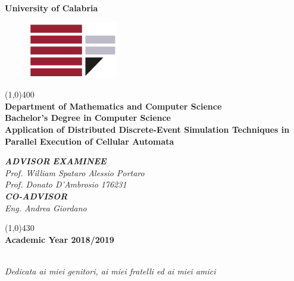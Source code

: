 \documentclass[12pt,a4paper,fleqn]{report}
\begin{document}
\begin{titlepage}
\begin{center}
\huge{\textbf{University of Calabria}}\\
\begin{figure}[bt]
\centering
\includegraphics[scale=0.5]{Stemma}\\
\end{figure}
\line(1,0){400}\\[5mm]
\Large{\textbf{Department of Mathematics and Computer Science}}\\
\Large{\textbf{Bachelor's Degree in Computer Science}}\\
\vspace{35mm}
\Huge{\textbf{Application of Distributed Discrete-Event Simulation Techniques in Parallel Execution of Cellular Automata}}
\end{center}
\vspace{35mm}
\begin{flushleft}
\large{\textsc{\textit{\textbf{ADVISOR}}}}
\hfill \large{\textit{\textsc{\textbf{EXAMINEE}}}}\\
\Large{\textit{Prof. William Spataro}}
\hfill \Large{\textit{Alessio Portaro}}\\
\Large{\textit{Prof. Donato D'Ambrosio}}
\hfill \Large{\textit{176231}}\\
\large{\textsc{\textit{\textbf{CO-ADVISOR}}}}\\
\Large{\textit{Eng. Andrea Giordano}}
\end{flushleft}
\vfill
\begin{center}
\line(1,0){430}\\[5mm]
{\large{\bf Academic Year 2018/2019}}\\
\end{center}
\end{titlepage}
\newpage 
\null
\newpage
\ \\[10cm]
\textit{Dedicata ai miei genitori, ai miei fratelli ed ai miei amici}
\newpage
\null
\newpage
\thispagestyle{empty}
\tableofcontents
\thispagestyle{empty}

\newpage\null\newpage
{}
\setcounter{page}{1}
\end{document}

